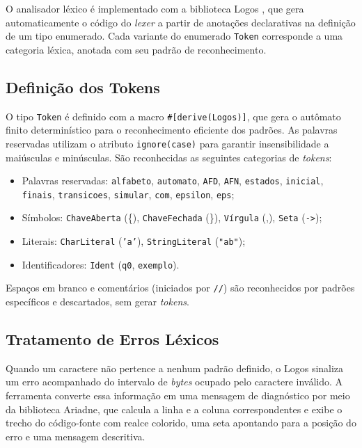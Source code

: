 \documentclass[
    12pt
    ,oneside
    ,a4paper
    ,chapter=TITLE
    ,section=TITLE
    ,sumario=abnt-6027-2012]{abntex2}
\begin{document}
O analisador léxico é implementado com a biblioteca Logos \cite{logos2021}, que gera
automaticamente o código do \textit{lexer} a partir de anotações declarativas na
definição de um tipo enumerado. Cada variante do enumerado \texttt{Token} corresponde
a uma categoria léxica, anotada com seu padrão de reconhecimento.

\subsection{Definição dos Tokens}
\label{sec:impl-tokens}

O tipo \texttt{Token} é definido com a macro \texttt{\#[derive(Logos)]}, que gera o
autômato finito determinístico para o reconhecimento eficiente dos padrões. As palavras
reservadas utilizam o atributo \texttt{ignore(case)} para garantir insensibilidade a
maiúsculas e minúsculas. São reconhecidas as seguintes categorias de \textit{tokens}:

\begin{itemize}
    \item Palavras reservadas: \texttt{alfabeto}, \texttt{automato},
          \texttt{AFD}, \texttt{AFN}, \texttt{estados}, \texttt{inicial},
          \texttt{finais}, \texttt{transicoes}, \texttt{simular}, \texttt{com},
          \texttt{epsilon}, \texttt{eps};
    \item Símbolos: \texttt{ChaveAberta} (\{), \texttt{ChaveFechada} (\}),
          \texttt{Vírgula} (,), \texttt{Seta} (\texttt{-{}>});
    \item Literais: \texttt{CharLiteral} (\texttt{'a'}), \texttt{StringLiteral}
          (\texttt{"ab"});
    \item Identificadores: \texttt{Ident} (\texttt{q0}, \texttt{exemplo}).
\end{itemize}

Espaços em branco e comentários (iniciados por \texttt{//}) são reconhecidos por padrões
específicos e descartados, sem gerar \textit{tokens}.

\subsection{Tratamento de Erros Léxicos}
\label{sec:impl-erros-lexicos}

Quando um caractere não pertence a nenhum padrão definido, o Logos sinaliza um erro
acompanhado do intervalo de \textit{bytes} ocupado pelo caractere inválido. A
ferramenta converte essa informação em uma mensagem de diagnóstico por meio da
biblioteca Ariadne, que calcula a linha e a coluna correspondentes e exibe o
trecho do código-fonte com realce colorido, uma seta apontando para a posição do erro e
uma mensagem descritiva.
\end{document}
